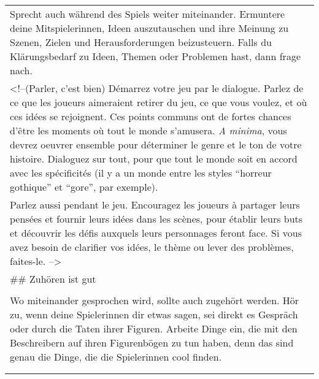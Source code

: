 \documentclass[]{article}
\begin{document}
\begin{longtable}[]{@{}l@{}}
\begin{minipage}[t]{0.05\columnwidth}
Sprecht auch während des Spiels weiter miteinander. Ermuntere deine
Mitspielerinnen, Ideen auszutauschen und ihre Meinung zu Szenen, Zielen
und Herausforderungen beizusteuern. Falls du Klärungsbedarf zu Ideen,
Themen oder Problemen hast, dann frage nach.
\strut\end{minipage}\tabularnewline
\begin{minipage}[t]{0.05\columnwidth}\raggedright\strut
\textless{}!--(Parler, c'est bien) Démarrez votre jeu par le dialogue.
Parlez de ce que les joueurs aimeraient retirer du jeu, ce que vous
voulez, et où ces idées se rejoignent. Ces points communs ont de fortes
chances d'être les moments où tout le monde s'amusera. \emph{A minima},
vous devrez oeuvrer ensemble pour déterminer le genre et le ton de votre
histoire. Dialoguez sur tout, pour que tout le monde soit en accord avec
les spécificités (il y a un monde entre les styles ``horreur gothique''
et ``gore'', par exemple).
\strut\end{minipage}\tabularnewline
\begin{minipage}[t]{0.05\columnwidth}\raggedright\strut
Parlez aussi pendant le jeu. Encouragez les joueurs à partager leurs
pensées et fournir leurs idées dans les scènes, pour établir leurs buts
et découvrir les défis auxquels leurs personnages feront face. Si vous
avez besoin de clarifier vos idées, le thème ou lever des problèmes,
faites-le. --\textgreater{}
\strut\end{minipage}\tabularnewline
\begin{minipage}[t]{0.05\columnwidth}\raggedright\strut
\#\# Zuhören ist gut
\strut\end{minipage}\tabularnewline
\begin{minipage}[t]{0.05\columnwidth}\raggedright\strut
\strut\end{minipage}\tabularnewline
\begin{minipage}[t]{0.05\columnwidth}\raggedright\strut
Wo miteinander gesprochen wird, sollte auch zugehört werden. Hör zu,
wenn deine Spielerinnen dir etwas sagen, sei direkt es Gespräch oder
durch die Taten ihrer Figuren. Arbeite Dinge ein, die mit den
Beschreibern auf ihren Figurenbögen zu tun haben, denn das sind genau
die Dinge, die die Spielerinnen cool finden.
\strut\end{minipage}\tabularnewline
\begin{minipage}[t]{0.05\columnwidth}\raggedright\strut
\strut\end{minipage}\tabularnewline
\begin{minipage}[t]{0.05\columnwidth}\raggedright\strut

\end{minipage}
\end{longtable}
\end{document}
